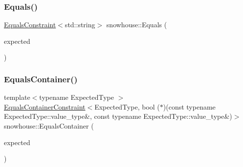 \mbox{\label{namespacesnowhouse_abb5ff4c2cdc309a57ddf619605956ee9}} 
\subsubsection{\texorpdfstring{Equals()}{Equals()}\hspace{0.1cm}{\footnotesize\ttfamily [2/2]}}
{\footnotesize\ttfamily \mbox{\hyperlink{structsnowhouse_1_1EqualsConstraint}{Equals\+Constraint}}$<$std\+::string$>$ snowhouse\+::\+Equals (\begin{DoxyParamCaption}\item[{const char $\ast$}]{expected }\end{DoxyParamCaption})\hspace{0.3cm}{\ttfamily [inline]}}

\mbox{\label{namespacesnowhouse_adcdb60feee213128183265a33b27708c}} 
\subsubsection{\texorpdfstring{EqualsContainer()}{EqualsContainer()}\hspace{0.1cm}{\footnotesize\ttfamily [1/2]}}
{\footnotesize\ttfamily template$<$typename Expected\+Type $>$ \\
\mbox{\hyperlink{structsnowhouse_1_1EqualsContainerConstraint}{Equals\+Container\+Constraint}}$<$Expected\+Type, bool ($\ast$)(const typename Expected\+Type\+::value\+\_\+type\&, const typename Expected\+Type\+::value\+\_\+type\&)$>$ snowhouse\+::\+Equals\+Container (\begin{DoxyParamCaption}\item[{const Expected\+Type \&}]{expected }\end{DoxyParamCaption})\hspace{0.3cm}{\ttfamily [inline]}}

\mbox{\label{namespacesnowhouse_af47dd2afd340aafb14bc831a0b7cd568}} 
